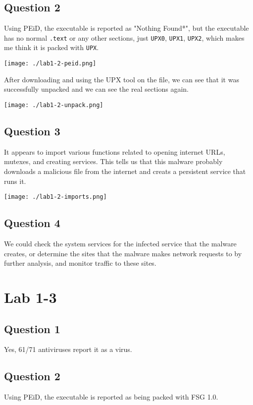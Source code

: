 \documentclass[11pt]{article}
\begin{document}
\subsection{Question 2}
\label{sec:orgaee3817}
Using PEiD, the executable is reported as "Nothing Found*", but the
executable has no normal \texttt{.text} or any other sections, just \texttt{UPX0},
\texttt{UPX1}, \texttt{UPX2}, which makes me think it is packed with \texttt{UPX}.

\begin{center}
\texttt{[image: ./lab1-2-peid.png]}
\end{center}

After downloading and using the UPX tool on the file, we can see that
it was successfully unpacked and we can see the real sections again.

\begin{center}
\texttt{[image: ./lab1-2-unpack.png]}
\end{center}
\subsection{Question 3}
\label{sec:orgb6bd06f}
It appears to import various functions related to opening internet
URLs, mutexes, and creating services. This tells us that this malware
probably downloads a malicious file from the internet and creats a
persistent service that runs it.

\begin{center}
\texttt{[image: ./lab1-2-imports.png]}
\end{center}
\subsection{Question 4}
\label{sec:orge8890a8}
We could check the system services for the infected service that the
malware creates, or determine the sites that the malware makes network
requests to by further analysis, and monitor traffic to these sites.
\section{Lab 1-3}
\label{sec:org55134e6}
\subsection{Question 1}
\label{sec:org5fde957}
Yes, 61/71 antiviruses report it as a virus.
\subsection{Question 2}
\label{sec:orga0812bf}
Using PEiD, the executable is reported as being packed with FSG 1.0.
\end{document}
